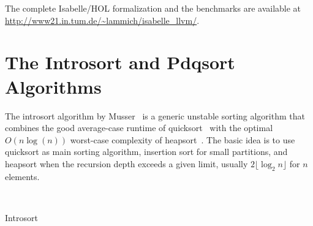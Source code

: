 \documentclass[runningheads]{llncs}
\begin{document}
  The complete Isabelle/HOL formalization and the benchmarks are available at \url{http://www21.in.tum.de/~lammich/isabelle_llvm/}.


%
%
%
%




\section{The Introsort and Pdqsort Algorithms}
  The introsort algorithm by Musser~\cite{Muss97} is a generic unstable sorting algorithm
  that combines the good average-case runtime of quicksort~\cite{Hoare61} with the optimal $O(n\log(n))$ worst-case complexity of heapsort~\cite{Will64}.
  The basic idea is to use quicksort as main sorting algorithm, insertion sort for small partitions, and heapsort when the recursion
  depth exceeds a given limit, usually $2\lfloor\log_2 n\rfloor$ for $n$ elements.


  \begin{algorithm}
  \begin{algorithmic}[1]
       \label{l:intrs:trivial}
         \label{l:intrs:aux}
         \label{l:intrs:finalis}
      \EndIf
    \EndProcedure

       \label{l:intrs:threshold}
        ~ \label{l:intrs:heapsort}
        \Else
           \label{l:intrs:part}
            \label{l:intrs:rec1}
            \label{l:intrs:rec2}
        \EndIf
      \EndIf
    \EndProcedure
  \end{algorithmic}
  \caption{Introsort}\label{alg:introsort}
  \end{algorithm}
\end{document}

